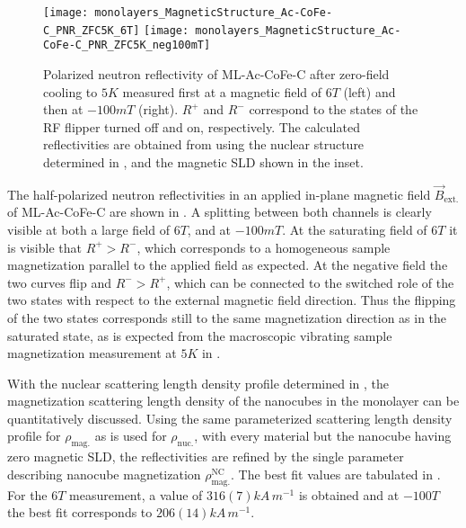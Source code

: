 \documentclass[\main/dresen_thesis.tex]{subfiles}
\begin{document}
  \begin{figure}[tb]
    \centering
    \texttt{[image: monolayers\_MagneticStructure\_Ac-CoFe-C\_PNR\_ZFC5K\_6T]}
    \texttt{[image: monolayers\_MagneticStructure\_Ac-CoFe-C\_PNR\_ZFC5K\_neg100mT]}
    \caption{\label{fig:monolayer:magneticStructure:pnr5K}Polarized neutron reflectivity of ML-Ac-CoFe-C after zero-field cooling to $5 \unit{K}$ measured first at a magnetic field of $6 \unit{T}$ (left) and then at $-100 \unit{mT}$ (right). $R^{+}$ and $R^{-}$ correspond to the states of the RF flipper turned off and on, respectively. The calculated reflectivities are obtained from using the nuclear structure determined in , and the magnetic SLD shown in the inset.}
  \end{figure}
  The half-polarized neutron reflectivities in an applied in-plane magnetic field $\vec{B}_\mathrm{ext.}$ of ML-Ac-CoFe-C are shown in .
  A splitting between both channels is clearly visible at both a large field of $6 \unit{T}$, and at $-100 \unit{mT}$.
  At the saturating field of $6 \unit{T}$ it is visible that $R^{+} > R^{-}$, which corresponds to a homogeneous sample magnetization parallel to the applied field as expected.
  At the negative field the two curves flip and $R^{-} > R^{+}$, which can be connected to the switched role of the two states with respect to the external magnetic field direction.
  Thus the flipping of the two states corresponds still to the same magnetization direction as in the saturated state, as is expected from the macroscopic vibrating sample magnetization measurement at $5 \unit{K}$ in .

  With the nuclear scattering length density profile determined in , the magnetization scattering length density of the nanocubes in the monolayer can be quantitatively discussed.
  Using the same parameterized scattering length density profile for $\rho_\mathrm{mag.}$ as is used for $\rho_\mathrm{nuc.}$, with every material but the nanocube having zero magnetic SLD, the reflectivities are refined by the single parameter describing nanocube magnetization $\rho_\mathrm{mag.}^\mathrm{NC}$.
  The best fit values are tabulated in .
  For the $6 \unit{T}$ measurement, a value of $316(7) \unit{kA \, m^{-1}}$ is obtained and at $-100 \unit{T}$ the best fit corresponds to $206(14) \unit{kA \, m^{-1}}$.
\end{document}
